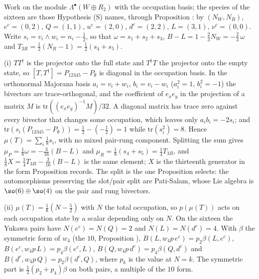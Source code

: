 Work on the module $\Lambda^{\bullet}(W \oplus R_{2})$ with the occupation basis; the species of the sixteen are those Hypothesis (S) names, through Proposition : by $(N_{W}, N_{R})$, $e^{c} = (0, 2)$, $Q = (1, 1)$, $u^{c} = (2, 0)$, $d^{c} = (2, 2)$, $L = (3, 1)$, $\nu^{c} = (0, 0)$. Write $s_{i} = v_{i} \wedge w_{i} = n_{i} - \tfrac12$, so that $\omega = s_{1} + s_{2} + s_{3}$, $B - L = 1 - \tfrac23 N_{W} = -\tfrac23\,\omega$ and $T_{3R} = \tfrac12(N_{R} - 1) = \tfrac12(s_{4} + s_{5})$.

(i) $TT^{\dagger}$ is the projector onto the full state and $T^{\dagger}T$ the projector onto the empty state, so $[T, T^{\dagger}] = P_{12345} - P_{\emptyset}$ is diagonal in the occupation basis. In the orthonormal Majorana basis $a_{i} = v_{i} + w_{i}$, $b_{i} = v_{i} - w_{i}$ ($a_{i}^{2} = 1$, $b_{i}^{2} = -1$) the bivectors are trace-orthogonal, and the coefficient of $e_{x}e_{y}$ in the projection of a matrix $M$ is $\mathrm{tr}((e_{x}e_{y})^{-1}M)/32$. A diagonal matrix has trace zero against every bivector that changes some occupation, which leaves only $a_{i}b_{i} = -2s_{i}$; and $\mathrm{tr}(s_{i}(P_{12345} - P_{\emptyset})) = \tfrac12 - (-\tfrac12) = 1$ while $\mathrm{tr}(s_{i}^{2}) = 8$. Hence $\mu(T) = \sum_{i}\tfrac18 s_{i}$, with no mixed pair-rung component. Splitting the sum gives $\mu_{P} = \tfrac18\omega = -\tfrac{3}{16}(B - L)$ and $\mu_{R} = \tfrac18(s_{4} + s_{5}) = \tfrac14 T_{3R}$, and $\tfrac18 X = \tfrac14 T_{3R} - \tfrac{3}{16}(B - L)$ is the same element; $X$ is the thirteenth generator in the form Proposition  records. The split is the one Proposition  selects: the automorphisms preserving the slot/pair split are Pati-Salam, whose Lie algebra is $\so(6) \oplus \so(4)$ on the pair and rung bivectors.

(ii) $\mu(T) = \tfrac18(N - \tfrac52)$ with $N$ the total occupation, so $p(\mu(T))$ acts on each occupation state by a scalar depending only on $N$. On the sixteen the Yukawa pairs have $N(e^{c}) = N(Q) = 2$ and $N(L) = N(d^{c}) = 4$. With $\beta$ the symmetric form of $w_{4}$ (the $10$, Proposition ), $B(L, w_{4}p\,e^{c}) = p_{2}\beta(L, e^{c})$, $B(e^{c}, w_{4}p\,L) = p_{4}\beta(e^{c}, L)$, $B(Q, w_{4}p\,d^{c}) = p_{4}\beta(Q, d^{c})$ and $B(d^{c}, w_{4}p\,Q) = p_{2}\beta(d^{c}, Q)$, where $p_{k}$ is the value at $N = k$. The symmetric part is $\tfrac12(p_{2} + p_{4})\beta$ on both pairs, a multiple of the $10$ form.

